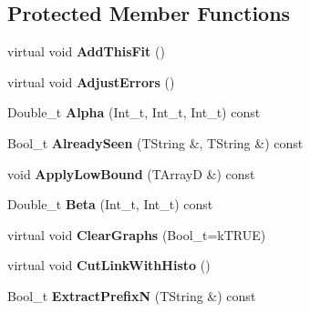 \subsection*{Protected Member Functions}
\begin{DoxyCompactItemize}
\item 
\hypertarget{classTSplineFit_a531edbf4c66f3c4cf34467e1019c8645}{
virtual void {\bfseries AddThisFit} ()}
\label{classTSplineFit_a531edbf4c66f3c4cf34467e1019c8645}

\item 
\hypertarget{classTSplineFit_a8347d1a602b8a74fdf1494ce09e7ab8b}{
virtual void {\bfseries AdjustErrors} ()}
\label{classTSplineFit_a8347d1a602b8a74fdf1494ce09e7ab8b}

\item 
\hypertarget{classTSplineFit_af4cc40c338ba305c811772b0c54fa17b}{
Double\_\-t {\bfseries Alpha} (Int\_\-t, Int\_\-t, Int\_\-t) const }
\label{classTSplineFit_af4cc40c338ba305c811772b0c54fa17b}

\item 
\hypertarget{classTSplineFit_a39b93378e479fd3bc3d3870a8ddbf0e4}{
Bool\_\-t {\bfseries AlreadySeen} (TString \&, TString \&) const }
\label{classTSplineFit_a39b93378e479fd3bc3d3870a8ddbf0e4}

\item 
\hypertarget{classTSplineFit_a9bf2c78bdee9ec88490e2df0e23fbbc1}{
void {\bfseries ApplyLowBound} (TArrayD \&) const }
\label{classTSplineFit_a9bf2c78bdee9ec88490e2df0e23fbbc1}

\item 
\hypertarget{classTSplineFit_a2f7b3e4cea0157fe1b8d50046c5d2820}{
Double\_\-t {\bfseries Beta} (Int\_\-t, Int\_\-t) const }
\label{classTSplineFit_a2f7b3e4cea0157fe1b8d50046c5d2820}

\item 
\hypertarget{classTSplineFit_a40d2f5ffe69807f212d3321ac1325428}{
virtual void {\bfseries ClearGraphs} (Bool\_\-t=kTRUE)}
\label{classTSplineFit_a40d2f5ffe69807f212d3321ac1325428}

\item 
\hypertarget{classTSplineFit_ae4145cfd4e0a0a996ed0369129db8d99}{
virtual void {\bfseries CutLinkWithHisto} ()}
\label{classTSplineFit_ae4145cfd4e0a0a996ed0369129db8d99}

\item 
\hypertarget{classTSplineFit_ab1d1d7867ef9a33449d29d86f80b3c18}{
Bool\_\-t {\bfseries ExtractPrefixN} (TString \&) const }
\label{classTSplineFit_ab1d1d7867ef9a33449d29d86f80b3c18}


\end{DoxyCompactItemize}
